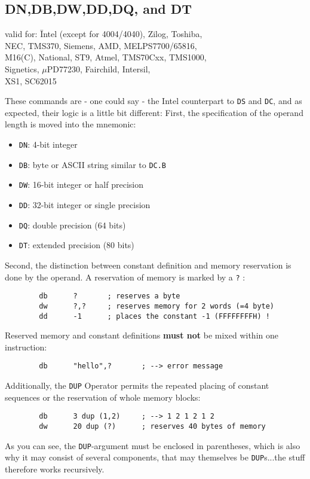 \documentclass[12pt,twoside]{report}
\makeatletter
\newcommand{\bb}[1]{{\bf #1}}
\newcommand{\tty}[1]{{\tt #1}}
\newcommand{\ttindex}[1]{\index{#1@{\tt #1}}}
\makeatother
\begin{document}

\subsection{DN,DB,DW,DD,DQ, and DT}
\ttindex{DN}\ttindex{DB}\ttindex{DW}\ttindex{DD}\ttindex{DQ}\ttindex{DT}

{\em\begin{tabbing}
valid for: \= Intel (except for 4004/4040), Zilog, Toshiba,\\
           \> NEC, TMS370, Siemens, AMD, MELPS7700/65816,\\
           \> M16(C), National, ST9, Atmel, TMS70Cxx, TMS1000,\\
           \> Signetics, $\mu$PD77230, Fairchild, Intersil,\\
           \> XS1, SC62015
\end{tabbing}}

These commands are - one could say - the Intel counterpart to \tty{DS} and
\tty{DC}, and as expected, their logic is a little bit different: First,
the specification of the operand length is moved into the mnemonic:
\begin{itemize}
\item{\tty{DN}: 4-bit integer}
\item{\tty{DB}: byte or ASCII string similar to \tty{DC.B}}
\item{\tty{DW}: 16-bit integer or half precision}
\item{\tty{DD}: 32-bit integer or single precision}
\item{\tty{DQ}: double precision   (64 bits)}
\item{\tty{DT}: extended precision (80 bits)}
\end{itemize}
Second, the distinction between constant definition and memory
reservation is done by the operand.  A reservation of memory is
marked by a \tty{?} :
\begin{verbatim}
        db      ?       ; reserves a byte
        dw      ?,?     ; reserves memory for 2 words (=4 byte)
        dd      -1      ; places the constant -1 (FFFFFFFFH) !
\end{verbatim}
Reserved memory and constant definitions \bb{must not} be mixed within one
instruction:
\begin{verbatim}
        db      "hello",?       ; --> error message
\end{verbatim}
Additionally, the \tty{DUP} Operator permits the repeated placing of
constant sequences or the reservation of whole memory blocks:
\begin{verbatim}
        db      3 dup (1,2)     ; --> 1 2 1 2 1 2
        dw      20 dup (?)      ; reserves 40 bytes of memory
\end{verbatim}
As you can see, the \tty{DUP}-argument must be enclosed in parentheses,
which is also why it may consist of several components, that may
themselves be \tty{DUP}s...the stuff therefore works recursively.
\end{document}
